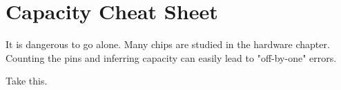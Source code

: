 \chapter*{Capacity Cheat Sheet}
It is dangerous to go alone. Many chips are studied in the hardware chapter. Counting the pins and inferring capacity can easily lead to "off-by-one" errors. 

Take this.

\begin{figure}[H]

\begin{minipage}[t]{0.49\linewidth}
{
 
\setlength{\tabcolsep}{3.0pt}
\setlength\cmidrulewidth{\heavyrulewidth} %
}
\end{minipage}
\end{figure}
